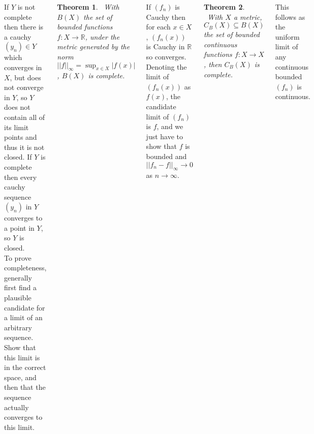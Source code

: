 \documentclass{tikzposter} %
\newtheorem{theorem}{Theorem}
\newtheorem{definition}{Definition}
\begin{document}
\begin{columns}
{    If $Y$ is not complete then there is a cauchy $(y_{n}) \in Y$ which converges in $X$, but does not converge in $Y$, so $Y$ does not contain all of its limit points and thus it is not closed. If $Y$ is complete then every cauchy sequence $(y_{n})$ in $Y$ converges to a point in $Y$, so $Y$ is closed. \\

    To prove completeness, generally first find a plausible candidate for a limit of an arbitrary sequence. Show that this limit is in the correct space, and then that the sequence actually converges to this limit. \\

    \begin{theorem}
    \ With $B(X)$ the set of bounded functions $f : X \to \mathbb{R}$, under the metric generated by the norm $||f||_{\infty} = \sup_{x \in X} |f(x)|$, $B(X)$ is complete.
    \end{theorem}
    \hphantom{}

    If $(f_{n})$ is Cauchy then for each $x \in X$, $(f_{n}(x))$ is Cauchy in $\mathbb{R}$ so converges. Denoting the limit of $(f_{n}(x))$ as $f(x)$, the candidate limit of $(f_{n})$ is $f$, and we just have to show that $f$ is bounded and $||f_{n} - f ||_{\infty} \to 0$ as $n \to \infty$. \\

    \begin{theorem}
    \ With $X$ a metric, $C_{B}(X) \subseteq B(X)$ the set of bounded continuous functions $f : X \to X$, then $C_{B}(X)$ is complete.
  \end{theorem}
  \hphantom{}

  This follows as the uniform limit of any continuous bounded $(f_{n})$ is continuous. \\

  }
\end{columns}
\end{document}
